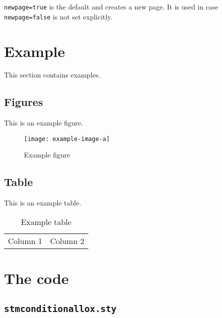 \documentclass[%
  type=article,%
  layout=koma,%
  hyperref=true,%
  conditionallox=false,%
  date=true,%
  listings=true%
]{stmtext}
\begin{document}
\texttt{newpage=true} is the default and creates a new page. It is used in case \texttt{newpage=false} is not set explicitly.

\section{Example}

This section contains examples.

\subsection{Figures}

This is an example figure.

\begin{figure}[htbp]
\centering
\texttt{[image: example-image-a]}
\label{fig:example:figure:1}
\caption{Example figure}
\end{figure}

\subsection{Table}

This is an example table.

\begin{table}[htbp]
\centering
\begin{tabular}{ll}
Column 1 & Column 2
\end{tabular}
\label{tab:example:table:1}
\caption{Example table}
\end{table}

% 

\newpage
\appendix

\section{The code}

\subsection{\protect\texttt{stmconditionallox.sty}}


\end{document}
